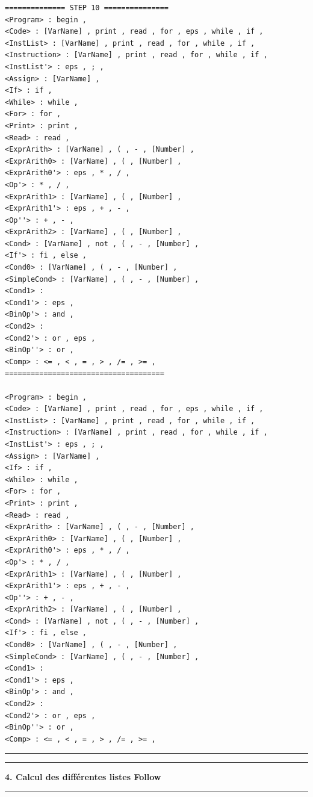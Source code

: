 \documentclass[pdftex,10pt,a4paper]{article}
\begin{document}
\begin{lstlisting}[breaklines]
============== STEP 10 ===============
<Program> : begin , 
<Code> : [VarName] , print , read , for , eps , while , if , 
<InstList> : [VarName] , print , read , for , while , if , 
<Instruction> : [VarName] , print , read , for , while , if , 
<InstList'> : eps , ; , 
<Assign> : [VarName] , 
<If> : if , 
<While> : while , 
<For> : for , 
<Print> : print , 
<Read> : read , 
<ExprArith> : [VarName] , ( , - , [Number] , 
<ExprArith0> : [VarName] , ( , [Number] , 
<ExprArith0'> : eps , * , / , 
<Op'> : * , / , 
<ExprArith1> : [VarName] , ( , [Number] , 
<ExprArith1'> : eps , + , - , 
<Op''> : + , - , 
<ExprArith2> : [VarName] , ( , [Number] , 
<Cond> : [VarName] , not , ( , - , [Number] , 
<If'> : fi , else , 
<Cond0> : [VarName] , ( , - , [Number] , 
<SimpleCond> : [VarName] , ( , - , [Number] , 
<Cond1> : 
<Cond1'> : eps , 
<BinOp'> : and , 
<Cond2> : 
<Cond2'> : or , eps , 
<BinOp''> : or , 
<Comp> : <= , < , = , > , /= , >= , 
=====================================

<Program> : begin , 
<Code> : [VarName] , print , read , for , eps , while , if , 
<InstList> : [VarName] , print , read , for , while , if , 
<Instruction> : [VarName] , print , read , for , while , if , 
<InstList'> : eps , ; , 
<Assign> : [VarName] , 
<If> : if , 
<While> : while , 
<For> : for , 
<Print> : print , 
<Read> : read , 
<ExprArith> : [VarName] , ( , - , [Number] , 
<ExprArith0> : [VarName] , ( , [Number] , 
<ExprArith0'> : eps , * , / , 
<Op'> : * , / , 
<ExprArith1> : [VarName] , ( , [Number] , 
<ExprArith1'> : eps , + , - , 
<Op''> : + , - , 
<ExprArith2> : [VarName] , ( , [Number] , 
<Cond> : [VarName] , not , ( , - , [Number] , 
<If'> : fi , else , 
<Cond0> : [VarName] , ( , - , [Number] , 
<SimpleCond> : [VarName] , ( , - , [Number] , 
<Cond1> : 
<Cond1'> : eps , 
<BinOp'> : and , 
<Cond2> : 
<Cond2'> : or , eps , 
<BinOp''> : or , 
<Comp> : <= , < , = , > , /= , >= , 
\end{lstlisting}

\noindent\rule[0.5ex]{\linewidth}{1pt}


\noindent\rule[0.5ex]{\linewidth}{1pt}
\textbf{4. Calcul des différentes listes Follow}\\
\noindent\rule[0.5ex]{\linewidth}{1pt}
\end{document}
